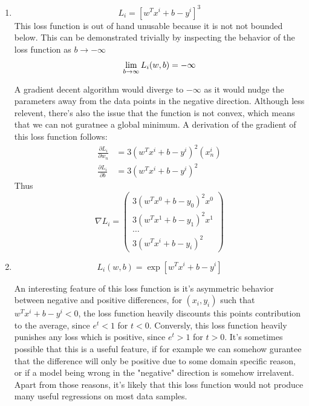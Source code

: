 \documentclass{article} %
\begin{document}
\begin{enumerate}
    Although not explicitly relevent, because we plan to use gradient
    decent, there is no closed form optimizer for this loss function
    due to complications with the absolute value causing the
    derivatives to depend on the sign of the error. The gradient of
    this loss function is presented below
    $$
    \nabla L_i =
    \begin{pmatrix}
      3|w^Tx^i+b-y^i|(w^Tx^i+b-y^i)(x^i_0) \\
      3|w^Tx^i+b-y^i|(w^Tx^i+b-y^i)(x^i_1) \\
      \hdots\\
      3|w^Tx^i+b-y^i|(w^Tx^i+b-y^i)(x^i_n) \\
      3|w^Tx^i+b-y^i|(w^Tx^i+b-y^i)
    \end{pmatrix}
    $$

  \item
    $$
    L_i = [w^Tx^i + b - y^i]^3
    $$
    This loss function is out of hand unusable because it is not not
    bounded below. This can be demonstrated trivially by inspecting
    the behavior of the loss function as $b\to-\infty$
    \[
      \lim_{b\to\-\infty} L_i(w, b) = -\infty
    \]

    A gradient decent algorithm would diverge to $-\infty$ as it
    would nudge the parameters away from the data points in the
    negative direction. Although less relevent, there's also the
    issue that the function is not convex, which means that we can
    not guratnee a global minimum. A derivation of the gradient of
    this loss function follows:
    \begin{align*}
      \frac{\partial L_i}{\partial w_n} &= 3(w^Tx^i + b - y^i)^2(x^i_n) \\
      \frac{\partial L_i}{\partial b} &= 3(w^Tx^i + b - y^i)^2
    \end{align*}
    Thus
    \[
      \nabla L_i =
      \begin{pmatrix}
        3(w^Tx^0 + b - y_0)^2 x^0 \\
        3(w^Tx^1 + b - y_1)^2 x^1 \\
        \hdots\\
        3(w^Tx^i + b - y_i)^2
      \end{pmatrix}
    \]
  \item
    \[
      L_i(w,b) = \exp[w^Tx^i + b - y^i]
    \]

    An interesting feature of this loss function is it's asymmetric
    behavior between negative and positive differences, for $(x_i,
    y_i)$ such that $w^Tx^i + b - y^i < 0$, the loss function heavily
    discounts this points contribution to the average, since $e^t <
    1$ for $t < 0$. Conversly, this loss function heavily punishes any
    loss which is positive, since $e^t > 1$ for $t > 0$. It's
    sometimes possible that this is a useful feature, if for example
    we can somehow gurantee that the difference will only be positive
    due to some domain specific reason, or if a model being wrong in
    the "negative" direction is somehow irrelavent. Apart from those
    reasons, it's likely that this loss function would not produce
    many useful regressions on most data samples.


\end{enumerate}
\end{document}
